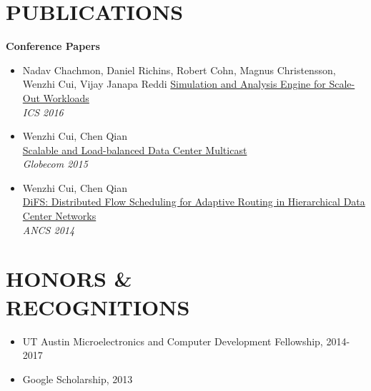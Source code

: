 \documentclass[margin, 9pt]{res} %
\begin{document}
\begin{resume}
\section{PUBLICATIONS}

{\large\textbf{Conference Papers}}

\begin{itemize}[leftmargin=*] \itemsep 0pt
  \item Nadav Chachmon, Daniel Richins, Robert Cohn, Magnus Christensson, Wenzhi Cui, Vijay Janapa Reddi
          \href{http://3nity.io/~vj/downloads/publications/sae16ics.pdf}{Simulation and Analysis Engine for Scale-Out Workloads}\\
          \textit{ICS 2016}

	\item Wenzhi Cui, Chen Qian\\
          \href{http://arxiv.org/pdf/1403.8065.pdf}{Scalable and Load-balanced Data Center Multicast}\\
          \textit{Globecom 2015}

	\item Wenzhi Cui, Chen Qian\\
          \href{http://www.cs.uky.edu/~qian/papers/DiFS.pdf}{DiFS: Distributed Flow Scheduling for Adaptive Routing in Hierarchical Data Center Networks}\\
          \textit{ANCS 2014}
\end{itemize}

 
\section{HONORS \&\\ RECOGNITIONS}

\vspace*{-1pt}
\begin{itemize}[leftmargin=*] \itemsep -1pt
	\item UT Austin Microelectronics and Computer Development Fellowship, 2014-2017
	\item Google Scholarship, 2013
\end{itemize}



\end{resume}
\end{document}
